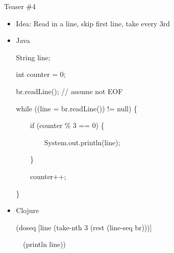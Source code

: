 \documentclass{beamer}
\begin{document}
\begin{frame}{Teaser \#4}
  \begin{itemize}
  \item Idea: Read in a line, skip first line, take every 3rd	
  \item Java\\
\begin{small}
{\ttfamily\color{black}
%
\textcolor[rgb]{0.13333334,0.54509807,0.13333334}{String}
\textcolor[rgb]{0.627451,0.32156864,0.1764706}{line};}

{\ttfamily\color{black}
\textcolor[rgb]{0.13333334,0.54509807,0.13333334}{int}
\textcolor[rgb]{0.627451,0.32156864,0.1764706}{counter} = 0;}

{\ttfamily\color{black}
br.readLine(); \textcolor[rgb]{0.69803923,0.13333334,0.13333334}{//
assume not EOF}}

{\ttfamily\color{black}
\textcolor[rgb]{0.49803922,0.0,0.49803922}{while} ((line =
br.readLine()) != \textcolor[rgb]{0.0,0.54509807,0.54509807}{null}) \{}

{\ttfamily\color{black}
\ \ \ \ \textcolor[rgb]{0.49803922,0.0,0.49803922}{if} (counter \% 3 ==
0) \{}

{\ttfamily\color{black}
\ \ \ \ \ \ \ \ System.out.println(line);}

{\ttfamily\color{black}
\ \ \ \ \}}

{\ttfamily\color{black}
\ \ \ \ counter++;}

{\ttfamily\color{black}
\}}

\end{small}
  \item Clojure\\
\begin{small}
{\ttfamily\color{black}
%
\textcolor[rgb]{0.54901963,0.54901963,0.54901963}{(}\textcolor[rgb]{0.49803922,0.0,0.49803922}{doseq}
[line
\textcolor[rgb]{0.54901963,0.54901963,0.54901963}{(}\textcolor[rgb]{0.28235295,0.23921569,0.54509807}{take-nth}
3
\textcolor[rgb]{0.54901963,0.54901963,0.54901963}{(}\textcolor[rgb]{0.28235295,0.23921569,0.54509807}{rest}
\textcolor[rgb]{0.54901963,0.54901963,0.54901963}{(}\textcolor[rgb]{0.28235295,0.23921569,0.54509807}{line-seq}
br\textcolor[rgb]{0.54901963,0.54901963,0.54901963}{)))}] }

{\ttfamily\color{black}
\ \ \textcolor[rgb]{0.54901963,0.54901963,0.54901963}{(}\textcolor[rgb]{0.28235295,0.23921569,0.54509807}{println}
line\textcolor[rgb]{0.54901963,0.54901963,0.54901963}{))}}
\end{small}
  \end{itemize}
\end{frame}
\end{document}
